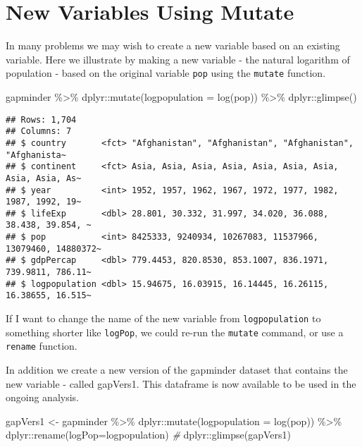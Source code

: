 \documentclass[
]{book}
\newenvironment{Shaded}{\begin{snugshade}}{\end{snugshade}}
\newcommand{\AttributeTok}[1]{\textcolor[rgb]{0.77,0.63,0.00}{#1}}
\newcommand{\CommentTok}[1]{\textcolor[rgb]{0.56,0.35,0.01}{\textit{#1}}}
\newcommand{\FunctionTok}[1]{\textcolor[rgb]{0.00,0.00,0.00}{#1}}
\newcommand{\NormalTok}[1]{#1}
\newcommand{\OtherTok}[1]{\textcolor[rgb]{0.56,0.35,0.01}{#1}}
\newcommand{\SpecialCharTok}[1]{\textcolor[rgb]{0.00,0.00,0.00}{#1}}
\begin{document}
\hypertarget{new-variables-using-mutate}{%
\section{New Variables Using Mutate}\label{new-variables-using-mutate}}

In many problems we may wish to create a new variable based on an existing variable. Here we illustrate by making a new variable - the natural logarithm of population - based on the original variable \texttt{pop} using the \texttt{mutate} function.

\begin{Shaded}
\begin{Highlighting}[]
\NormalTok{gapminder }\SpecialCharTok{\%\textgreater{}\%}
\NormalTok{  dplyr}\SpecialCharTok{::}\FunctionTok{mutate}\NormalTok{(}\AttributeTok{logpopulation =} \FunctionTok{log}\NormalTok{(pop)) }\SpecialCharTok{\%\textgreater{}\%}
\NormalTok{  dplyr}\SpecialCharTok{::}\FunctionTok{glimpse}\NormalTok{()}
\end{Highlighting}
\end{Shaded}

\begin{verbatim}
## Rows: 1,704
## Columns: 7
## $ country       <fct> "Afghanistan", "Afghanistan", "Afghanistan", "Afghanista~
## $ continent     <fct> Asia, Asia, Asia, Asia, Asia, Asia, Asia, Asia, Asia, As~
## $ year          <int> 1952, 1957, 1962, 1967, 1972, 1977, 1982, 1987, 1992, 19~
## $ lifeExp       <dbl> 28.801, 30.332, 31.997, 34.020, 36.088, 38.438, 39.854, ~
## $ pop           <int> 8425333, 9240934, 10267083, 11537966, 13079460, 14880372~
## $ gdpPercap     <dbl> 779.4453, 820.8530, 853.1007, 836.1971, 739.9811, 786.11~
## $ logpopulation <dbl> 15.94675, 16.03915, 16.14445, 16.26115, 16.38655, 16.515~
\end{verbatim}

If I want to change the name of the new variable from \texttt{logpopulation} to something shorter like \texttt{logPop}, we could re-run the \texttt{mutate} command, or use a \texttt{rename} function.

In addition we create a new version of the gapminder dataset that contains the new variable - called gapVers1. This dataframe is now available to be used in
the ongoing analysis.

\begin{Shaded}
\begin{Highlighting}[]
\NormalTok{gapVers1 }\OtherTok{\textless{}{-}}\NormalTok{ gapminder }\SpecialCharTok{\%\textgreater{}\%}
\NormalTok{  dplyr}\SpecialCharTok{::}\FunctionTok{mutate}\NormalTok{(}\AttributeTok{logpopulation =} \FunctionTok{log}\NormalTok{(pop)) }\SpecialCharTok{\%\textgreater{}\%}
\NormalTok{  dplyr}\SpecialCharTok{::}\FunctionTok{rename}\NormalTok{(}\AttributeTok{logPop=}\NormalTok{logpopulation) }
\CommentTok{\#}
\NormalTok{  dplyr}\SpecialCharTok{::}\FunctionTok{glimpse}\NormalTok{(gapVers1)}
\end{Highlighting}
\end{Shaded}
\end{document}
